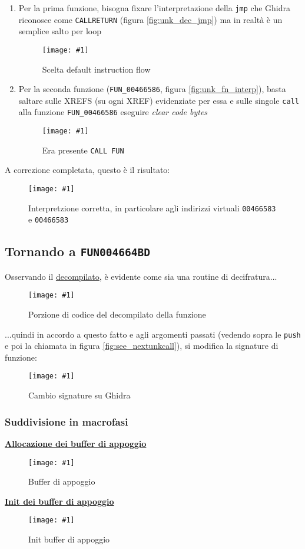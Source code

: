 \documentclass[
    a4paper, %
    11pt %
]{article}
\newcommand{\pic}[4]{\begin{figure}[H]
            \centering
            \texttt{[image: \#1]}
            \caption{#2}
            \label{fig:#1}
            \end{figure}}
\begin{document}
            \begin{enumerate}
                \item Per la prima funzione, bisogna fixare l'interpretazione della \texttt{jmp} che Ghidra riconosce 
                come \texttt{CALL\textunderscore RETURN} (figura \ref{fig:unk_dec_jmp}) 
                ma in realtà è un semplice salto per loop
                \pic{branch}{Scelta default instruction flow}{15cm}{5cm}

                \item Per la seconda funzione (\texttt{FUN\_00466586}, figura \ref{fig:unk_fn_interp}), basta saltare sulle XREFS (su ogni XREF) evidenziate per essa e sulle 
                singole \texttt{call} alla funzione \texttt{FUN\_00466586} eseguire \textit{clear code bytes}
                \pic{clearcodebytes_call}{Era presente \texttt{CALL FUN\textunderscore 00466586}}{8cm}{3cm}
            \end{enumerate}
            A correzione completata, questo è il risultato:
            \pic{fixing_ghidra_interp}{Interpretzione corretta, in particolare agli indirizzi virtuali \texttt{00466583} e \texttt{00466583}}{19cm}{6cm}

            \subsection{Tornando a \texttt{FUN\textunderscore 004664BD}}
            Osservando il \underline{decompilato}, è evidente come sia una routine di decifratura...
            \pic{partof_decrypt}{Porzione di codice del decompilato della funzione}{16cm}{5cm}
            
            ...quindi in accordo a questo fatto e agli argomenti passati (vedendo sopra le 
            \texttt{push} e poi la chiamata in figura \ref{fig:see_nextunkcall}), si modifica la signature di funzione:

            \pic{change_signature}{Cambio signature su Ghidra}{19cm}{2.5cm}

            \subsubsection{Suddivisione in macrofasi}
            
            \textbf{\underline{Allocazione dei buffer di appoggio}}
            \pic{dec_allocbufs}{Buffer di appoggio}{13cm}{5cm}

            \pagebreak
            \textbf{\underline{Init dei buffer di appoggio}}
            \pic{dec_init}{Init buffer di appoggio}{13cm}{5cm}
\end{document}
